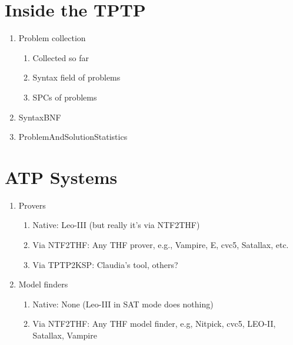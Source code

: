 \documentclass[runningheads]{llncs}
\begin{document}
\section{Inside the TPTP}
\label{InsideTPTP}

\begin{enumerate}
\item Problem collection
      \begin{enumerate}
      \item Collected so far
      \item Syntax field of problems
      \item SPCs of problems
      \end{enumerate}
\item SyntaxBNF
\item ProblemAndSolutionStatistics
\end{enumerate}

\section{ATP Systems}
\label{ATPSystems}

      \begin{enumerate}
      \item Provers
            \begin{enumerate}
            \item  Native: Leo-III (but really it's via NTF2THF)
            \item Via NTF2THF: Any THF prover, e.g., Vampire, E, cvc5, Satallax, etc.
            \item Via TPTP2KSP: Claudia's tool, others?
            \end{enumerate}
      \item Model finders
            \begin{enumerate}
            \item Native: None (Leo-III in SAT mode does nothing)
            \item Via NTF2THF: Any THF model finder, e.g, Nitpick, cvc5, LEO-II, Satallax, Vampire
            \end{enumerate}
      \end{enumerate}

\end{document}

